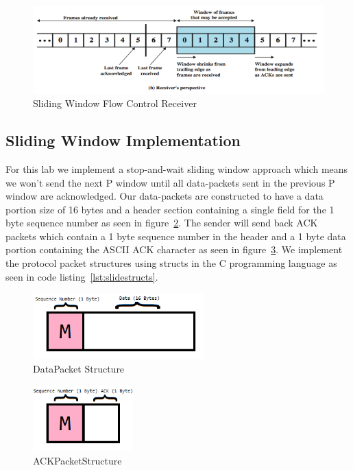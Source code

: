 \documentclass[12pt]{article}
\begin{document}
\begin{figure}[H]
    \centering
    \includegraphics[width=4.5in]{slide_rx_diagram.png}
    \caption{Sliding Window Flow Control Receiver}
    \label{fig:sliderx}
\end{figure}

\subsection{Sliding Window Implementation}
\label{sect:slideimplmentation}
For this lab we implement a stop-and-wait sliding window approach which 
means we won't send the next P window until all data-packets sent in the
previous P window are acknowledged. Our data-packets are constructed to 
have a data portion size of 16 bytes and a header section containing a
single field for the 1 byte sequence number as seen in 
figure~\ref{fig:slidedatastructs}. The sender will send back ACK packets
which contain a 1 byte sequence number in the header and a 1 byte data portion
containing the ASCII ACK character as seen in figure~\ref{fig:slideackstructs}. 
We implement the protocol packet structures using structs in the C 
programming language as seen in code listing~\ref{lst:slidestructs}. 

\begin{figure}[H]
    \centering
    \includegraphics[height=1in]{datapacket_struct.png}
    \caption{DataPacket Structure}
    \label{fig:slidedatastructs}
\end{figure}

\begin{figure}[H]
    \centering
    \includegraphics[height=1in]{ack_struct.png}
    \caption{ACKPacketStructure}
    \label{fig:slideackstructs}
\end{figure}
\end{document}
